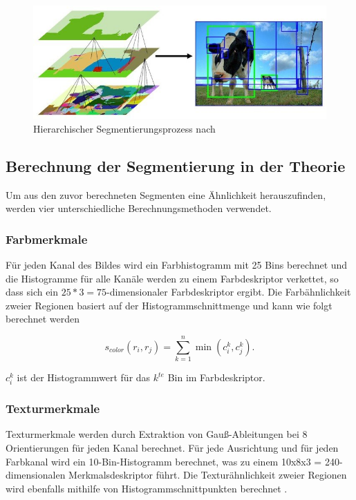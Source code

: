 \begin{figure}[htb]
	\centering
	\includegraphics[width=\textwidth]{images/segmentation}
	\caption[Hierarchischer Segmentierungsprozess]{Hierarchischer Segmentierungsprozess nach \citeauthor{UijlingsIJCV2013}\cites{learnopencv}{UijlingsIJCV2013}}
	\label{fig:segmentation}
\end{figure}

\subsection{Berechnung der Segmentierung in der Theorie}

Um aus den zuvor berechneten Segmenten eine Ähnlichkeit herauszufinden, werden vier unterschiedliche Berechnungsmethoden verwendet. 

\subsubsection*{Farbmerkmale}

Für jeden Kanal des Bildes wird ein Farbhistogramm mit 25 \glspl{Bin} berechnet und die Histogramme für alle Kanäle werden zu einem Farbdeskriptor verkettet, so dass sich ein $25*3 = 75$-dimensionaler Farbdeskriptor ergibt. Die Farbähnlichkeit zweier Regionen basiert auf der Histogrammschnittmenge und kann wie folgt berechnet werden \cite{learnopencv}

\begin{equation}
	s_{color}(r_{i},r_{j}) = \sum_{k=1}^{n} \min(c_{i}^k,c_{j}^k).
\end{equation}

$c^k_i$ ist der Histogrammwert für das $k^{te}$ \gls{Bin} im Farbdeskriptor.

\subsubsection*{Texturmerkmale}

Texturmerkmale werden durch Extraktion von Gauß-Ableitungen bei 8 Orientierungen für jeden Kanal berechnet. Für jede Ausrichtung und für jeden Farbkanal wird ein 10-\gls{Bin}-Histogramm berechnet, was zu einem 10x8x3 = 240-dimensionalen Merkmalsdeskriptor führt.
Die Texturähnlichkeit zweier Regionen wird ebenfalls mithilfe von Histogrammschnittpunkten berechnet \cite{learnopencv}.

